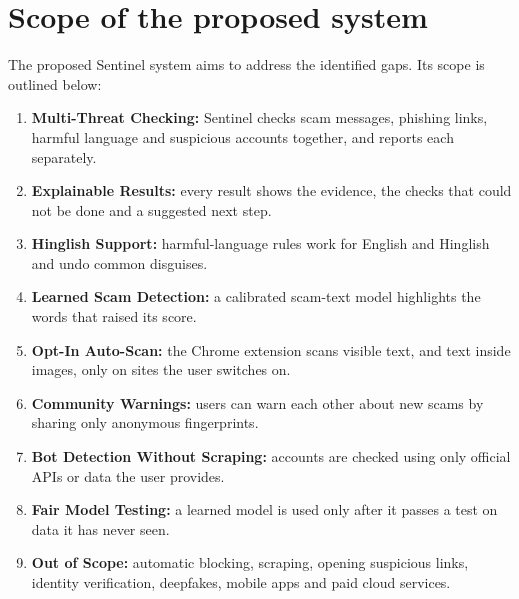 \section{Scope of the proposed system}
\noindent The proposed Sentinel system aims to address the identified gaps. Its scope is outlined below:
\begin{enumerate}
\item \textbf{Multi-Threat Checking:} Sentinel checks scam messages, phishing links, harmful language and suspicious accounts together, and reports each separately.
\item \textbf{Explainable Results:} every result shows the evidence, the checks that could not be done and a suggested next step.
\item \textbf{Hinglish Support:} harmful-language rules work for English and Hinglish and undo common disguises.
\item \textbf{Learned Scam Detection:} a calibrated scam-text model highlights the words that raised its score.
\item \textbf{Opt-In Auto-Scan:} the Chrome extension scans visible text, and text inside images, only on sites the user switches on.
\item \textbf{Community Warnings:} users can warn each other about new scams by sharing only anonymous fingerprints.
\item \textbf{Bot Detection Without Scraping:} accounts are checked using only official APIs or data the user provides.
\item \textbf{Fair Model Testing:} a learned model is used only after it passes a test on data it has never seen.
\item \textbf{Out of Scope:} automatic blocking, scraping, opening suspicious links, identity verification, deepfakes, mobile apps and paid cloud services.
\end{enumerate}
